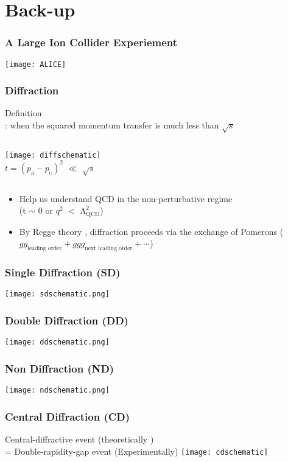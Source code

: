 

\section{Back-up}


\begin{frame}
\frametitle{A Large Ion Collider Experiement }
\texttt{[image: ALICE]}\\
\end{frame}

\begin{frame}
\frametitle{Diffraction}
Definition\\
: when the squared momentum transfer is much less than $\sqrt{s}$
\begin{columns}[c]
\texttt{[image: diffschematic]}\\
$t = (p_\mathrm{a} - p_\mathrm{c})^2$ $\ll$ $\sqrt{s}$
\end{columns}
\begin{itemize}
\item{Help us understand QCD in the non-perturbative regime \\ (t $\sim$ 0 or $q^2$ $<$ $\mathrm{\Lambda}^2_\mathrm{QCD}$)}
\item{By Regge theory \footnotemark[1] \footnotemark[2] \footnotemark[3], diffraction proceeds via the exchange of Pomerons (${gg}_{\textrm{leading order}} + {ggg}_{\textrm{next leading order}} + \cdots$)}
\end{itemize}
\end{frame}

\begin{frame}
\frametitle{Single Diffraction (SD)}
\texttt{[image: sdschematic.png]}\\
\end{frame}
\begin{frame}
\frametitle{Double Diffraction (DD)}
\texttt{[image: ddschematic.png]}\\
\end{frame}
\begin{frame}
\frametitle{Non Diffraction (ND)}
\texttt{[image: ndschematic.png]}\\
\end{frame}
\begin{frame}
\frametitle{Central Diffraction (CD)}
Central-diffractive event (theoretically ) \\= Double-rapidity-gap event (Experimentally)
\texttt{[image: cdschematic]}\\
\end{frame}













